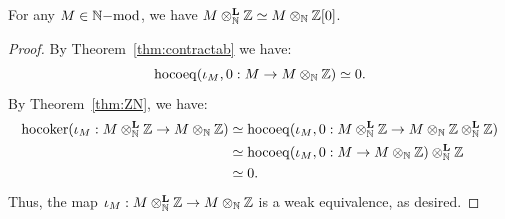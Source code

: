\begin{corollary}\label{cor:main}
For any $M \in \mathbb{N}\mathrm{-mod}$, we have $M \otimes^{\boldsymbol{\mathrm{L}}}_{\mathbb{N}} \mathbb{Z} \simeq M \otimes_{\mathbb{N}} \mathbb{Z}[0]$.
\end{corollary}
\begin{proof}
By Theorem~\ref{thm:contractab} we have:
\[\operatorname{hocoeq}(\iota_M,0: M \rightarrow M \otimes_{\mathbb{N}} \mathbb{Z}) \simeq 0.\]
By Theorem~\ref{thm:ZN}, we have:
\begin{align*}
\operatorname{hocoker}(\iota_M: M \otimes^{\boldsymbol{\mathrm{L}}}_{\mathbb{N}} \mathbb{Z} \rightarrow M \otimes_{\mathbb{N}} \mathbb{Z}) & \simeq \operatorname{hocoeq}(\iota_M,0: M \otimes^{\boldsymbol{\mathrm{L}}}_{\mathbb{N}} \mathbb{Z} \rightarrow M \otimes_{\mathbb{N}} \mathbb{Z} \otimes^{\boldsymbol{\mathrm{L}}}_{\mathbb{N}} \mathbb{Z})\\
&\simeq \operatorname{hocoeq}(\iota_M,0: M \rightarrow M \otimes_{\mathbb{N}} \mathbb{Z}) \otimes^{\boldsymbol{\mathrm{L}}}_{\mathbb{N}} \mathbb{Z}\\
&\simeq 0.
\end{align*}
Thus, the map $\iota_M: M \otimes^{\boldsymbol{\mathrm{L}}}_{\mathbb{N}} \mathbb{Z} \rightarrow M \otimes_{\mathbb{N}} \mathbb{Z}$ is a weak equivalence, as desired.
\end{proof}
